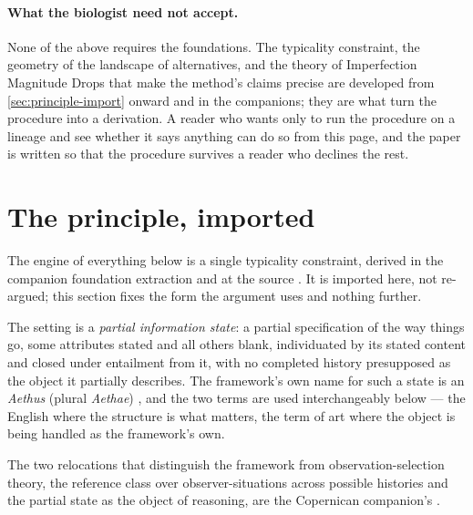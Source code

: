 \documentclass[11pt]{article}
\theoremstyle{definition}
\begin{document}
\paragraph{What the biologist need not accept.} None of the above requires the foundations. The typicality constraint, the geometry of the landscape of alternatives, and the theory of Imperfection Magnitude Drops that make the method's claims precise are developed from \autoref{sec:principle-import} onward and in the companions; they are what turn the procedure into a derivation. A reader who wants only to run the procedure on a lineage and see whether it says anything can do so from this page, and the paper is written so that the procedure survives a reader who declines the rest.

\section{The principle, imported}
\label{sec:principle-import}

The engine of everything below is a single typicality constraint, derived in the companion foundation extraction \cite{NexicFoundation} and at the source \cite{Nexus}. It is imported here, not re-argued; this section fixes the form the argument uses and nothing further.

The setting is a \emph{partial information state}: a partial specification of the way things go, some attributes stated and all others blank, individuated by its stated content and closed under entailment from it, with no completed history presupposed as the object it partially describes. The framework's own name for such a state is an \emph{Aethus} (plural \emph{Aethae}) \cite{Aethus, Nexus}, and the two terms are used interchangeably below --- the English where the structure is what matters, the term of art where the object is being handled as the framework's own.

The two relocations that distinguish the framework from observation-selection theory, the reference class over observer-situations across possible histories and the partial state as the object of reasoning, are the Copernican companion's \cite{Nexus}.
\end{document}
